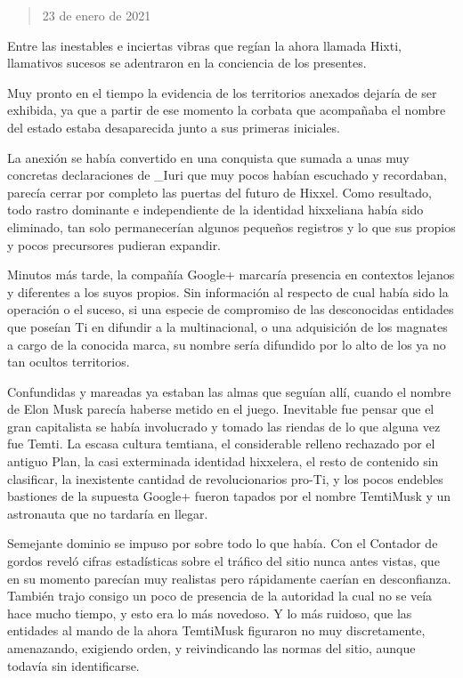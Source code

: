 \documentclass[
]{book}
\begin{document}
\begin{quote}
23 de enero de 2021
\end{quote}

Entre las inestables e inciertas vibras que regían la ahora llamada Hixti, llamativos sucesos se adentraron en la conciencia de los presentes.

Muy pronto en el tiempo la evidencia de los territorios anexados dejaría de ser exhibida, ya que a partir de ese momento la corbata que acompañaba el nombre del estado estaba desaparecida junto a sus primeras iniciales.

La anexión se había convertido en una conquista que sumada a unas muy concretas declaraciones de \_Iuri que muy pocos habían escuchado y recordaban, parecía cerrar por completo las puertas del futuro de Hixxel. Como resultado, todo rastro dominante e independiente de la identidad hixxeliana había sido eliminado, tan solo permanecerían algunos pequeños registros y lo que sus propios y pocos precursores pudieran expandir.

Minutos más tarde, la compañía Google+ marcaría presencia en contextos lejanos y diferentes a los suyos propios. Sin información al respecto de cual había sido la operación o el suceso, si una especie de compromiso de las desconocidas entidades que poseían Ti en difundir a la multinacional, o una adquisición de los magnates a cargo de la conocida marca, su nombre sería difundido por lo alto de los ya no tan ocultos territorios.

Confundidas y mareadas ya estaban las almas que seguían allí, cuando el nombre de Elon Musk parecía haberse metido en el juego. Inevitable fue pensar que el gran capitalista se había involucrado y tomado las riendas de lo que alguna vez fue Temti. La escasa cultura temtiana, el considerable relleno rechazado por el antiguo Plan, la casi exterminada identidad hixxelera, el resto de contenido sin clasificar, la inexistente cantidad de revolucionarios pro-Ti, y los pocos endebles bastiones de la supuesta Google+ fueron tapados por el nombre TemtiMusk y un astronauta que no tardaría en llegar.

Semejante dominio se impuso por sobre todo lo que había. Con el Contador de gordos reveló cifras estadísticas sobre el tráfico del sitio nunca antes vistas, que en su momento parecían muy realistas pero rápidamente caerían en desconfianza. También trajo consigo un poco de presencia de la autoridad la cual no se veía hace mucho tiempo, y esto era lo más novedoso. Y lo más ruidoso, que las entidades al mando de la ahora TemtiMusk figuraron no muy discretamente, amenazando, exigiendo orden, y reivindicando las normas del sitio, aunque todavía sin identificarse.
\end{document}

